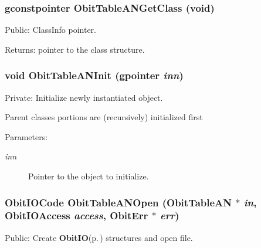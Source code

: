 \subsubsection{\setlength{\rightskip}{0pt plus 5cm}gconstpointer Obit\-Table\-ANGet\-Class (void)}\label{ObitTableAN_8c_a17}


Public: Class\-Info pointer. 

\begin{Desc}
\item[Returns:]pointer to the class structure. \end{Desc}
\subsubsection{\setlength{\rightskip}{0pt plus 5cm}void Obit\-Table\-ANInit (gpointer {\em inn})}\label{ObitTableAN_8c_a8}


Private: Initialize newly instantiated object. 

Parent classes portions are (recursively) initialized first \begin{Desc}
\item[Parameters:]
\begin{description}
\item[{\em inn}]Pointer to the object to initialize. \end{description}
\end{Desc}
\subsubsection{\setlength{\rightskip}{0pt plus 5cm}Obit\-IOCode Obit\-Table\-ANOpen ({\bf Obit\-Table\-AN} $\ast$ {\em in}, Obit\-IOAccess {\em access}, {\bf Obit\-Err} $\ast$ {\em err})}\label{ObitTableAN_8c_a21}


Public: Create {\bf Obit\-IO}{\rm (p.\,\pageref{structObitIO})} structures and open file. 

